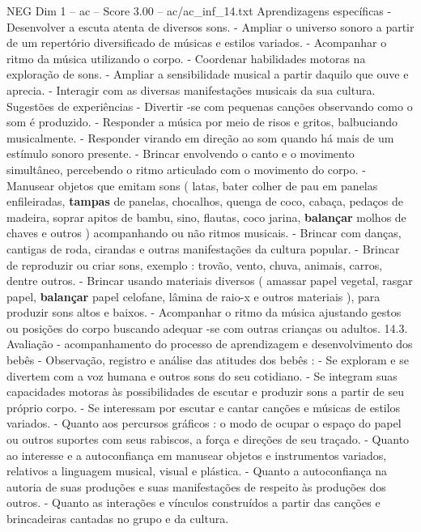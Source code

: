 \begin{textsample}{NEG Dim 1 – ac – Score 3.00 – ac/ac\_inf\_14.txt}
Aprendizagens específicas - Desenvolver a escuta atenta de diversos sons. - Ampliar o universo sonoro a partir de um repertório diversificado de músicas e estilos variados. - Acompanhar o ritmo da música utilizando o corpo. - Coordenar habilidades motoras na exploração de sons. - Ampliar a sensibilidade musical a partir daquilo que ouve e aprecia. - Interagir com as diversas manifestações musicais da sua cultura.
Sugestões de experiências - Divertir -se com pequenas canções observando como o som é produzido. - Responder a música por meio de risos e gritos, balbuciando musicalmente. - Responder virando em direção ao som quando há mais de um estímulo sonoro presente. - Brincar envolvendo o canto e o movimento simultâneo, percebendo o ritmo articulado com o movimento do corpo. - Manusear objetos que emitam sons ( latas, bater colher de pau em panelas enfileiradas, \textbf{tampas} de panelas, chocalhos, quenga de coco, cabaça, pedaços de madeira, soprar apitos de bambu, sino, flautas, coco jarina, \textbf{balançar} molhos de chaves e outros ) acompanhando ou não ritmos musicais. - Brincar com danças, cantigas de roda, cirandas e outras manifestações da cultura popular. - Brincar de reproduzir ou criar sons, exemplo : trovão, vento, chuva, animais, carros, dentre outros. - Brincar usando materiais diversos ( amassar papel vegetal, rasgar papel, \textbf{balançar} papel celofane, lâmina de raio-x e outros materiais ), para produzir sons altos e baixos. - Acompanhar o ritmo da música ajustando gestos ou posições do corpo buscando adequar -se com outras crianças ou adultos. 14.3.
Avaliação - acompanhamento do processo de aprendizagem e desenvolvimento dos bebês - Observação, registro e análise das atitudes dos bebês : - Se exploram e se divertem com a voz humana e outros sons do seu cotidiano. - Se integram suas capacidades motoras às possibilidades de escutar e produzir sons a partir de seu próprio corpo. - Se interessam por escutar e cantar canções e músicas de estilos variados. - Quanto aos percursos gráficos : o modo de ocupar o espaço do papel ou outros suportes com seus rabiscos, a força e direções de seu traçado. - Quanto ao interesse e a autoconfiança em manusear objetos e instrumentos variados, relativos a linguagem musical, visual e plástica. - Quanto a autoconfiança na autoria de suas produções e suas manifestações de respeito às produções dos outros. - Quanto as interações e vínculos construídos a partir das canções e brincadeiras cantadas no grupo e da cultura.

\end{textsample}
